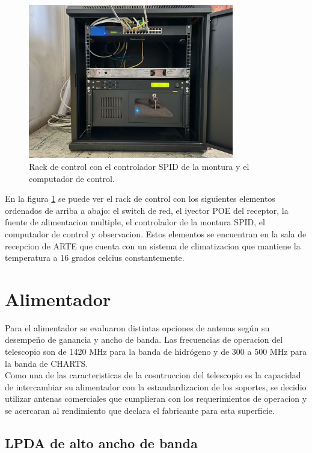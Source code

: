 \begin{figure}
    \centering
    \includegraphics[width=0.8\textwidth]{img/rack}
    \caption{Rack de control con el controlador SPID de la montura y el computador de control.}
    \label{fig:ensamble12}
\end{figure}

En la figura \ref{fig:ensamble12} se puede ver el rack de control con los siguientes elementos ordenados de arriba a abajo: el switch de red, el iyector POE del receptor, la fuente de alimentacion multiple, el controlador de la montura SPID, el computador de control y observacion. Estos elementos se encuentran en la sala de recepcion de ARTE que cuenta con un sistema de climatizacion que mantiene la temperatura a 16 grados celcius constantemente.\\

\section{Alimentador}

Para el alimentador se evaluaron distintas opciones de antenas según su desempeño de ganancia y ancho de banda. Las frecuencias de operacion del telescopio son de 1420 MHz para la banda de hidrógeno y de 300 a 500 MHz para la banda de CHARTS.\\

Como una de las caracteristicas de la cosntruccion del telescopio es la capacidad de intercambiar su alimentador con la estandardizacion de los soportes, se decidio utilizar antenas comerciales que cumplieran con los requerimientos de operacion y se acercaran al rendimiento que declara el fabricante para esta superficie.\\

\subsection{LPDA de alto ancho de banda}

